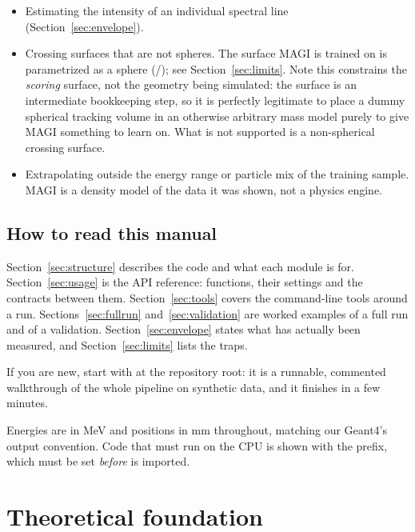 \documentclass[11pt,a4paper]{article}
\begin{document}
\begin{itemize}[nosep]
  \item Estimating the intensity of an individual spectral line
    (Section~\ref{sec:envelope}).
  \item Crossing surfaces that are not spheres. The surface MAGI is trained on
    is parametrized as a sphere (/); see
    Section~\ref{sec:limits}. Note this constrains the \emph{scoring} surface,
    not the geometry being simulated: the surface is an intermediate bookkeeping
    step, so it is perfectly legitimate to place a dummy spherical tracking
    volume in an otherwise arbitrary mass model purely to give MAGI something to
    learn on. What is not supported is a non-spherical crossing surface.
  \item Extrapolating outside the energy range or particle mix of the training
    sample. MAGI is a density model of the data it was shown, not a physics
    engine.
\end{itemize}

\subsection{How to read this manual}

Section~\ref{sec:structure} describes the code and what each module is for.
Section~\ref{sec:usage} is the API reference: functions, their settings and
the contracts between them. Section~\ref{sec:tools} covers the command-line
tools around a run. Sections~\ref{sec:fullrun} and~\ref{sec:validation} are
worked examples of a full run and of a validation.
Section~\ref{sec:envelope} states what has actually been measured, and
Section~\ref{sec:limits} lists the traps.

If you are new, start with  at the repository root:
it is a runnable, commented walkthrough of the whole pipeline on synthetic
data, and it finishes in a few minutes.

\begin{maginote}[Conventions]
Energies are in MeV and positions in mm throughout, matching our Geant4's
output convention. Code that must run on the CPU is shown with the
 prefix, which must be set \emph{before}
 is imported.
\end{maginote}

\section{Theoretical foundation}
\label{sec:theory}
\end{document}
